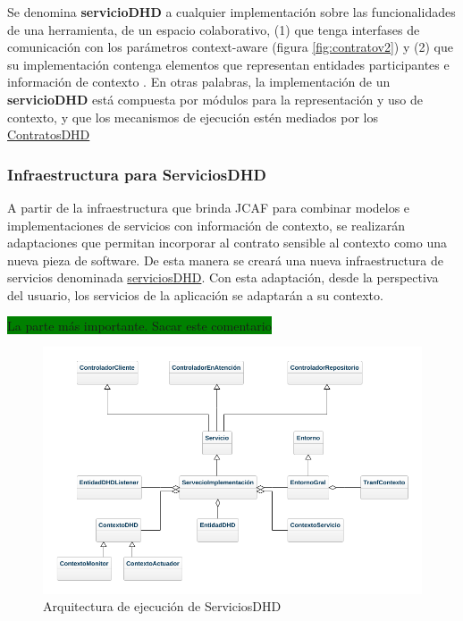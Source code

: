 \begin{itemize}
\begin{defi}[ServiciosDHD:] \label{serviciosDHD}

Se denomina \textbf{servicioDHD} a cualquier implementación sobre las funcionalidades de una herramienta, de un espacio colaborativo, (1) que tenga interfases de comunicación con los parámetros context-aware (figura \ref{fig:contratov2}) y (2) que su implementación contenga elementos que representan entidades participantes e información de contexto \cite{Dey}. En otras palabras, la implementación de un \textbf{servicioDHD} está compuesta por módulos para la representación y uso de contexto, y que los mecanismos de ejecución estén mediados por los \hyperref[contratosdhd]{ContratosDHD} 

\end{defi}

\subsubsection{Infraestructura para ServiciosDHD}

A partir de la infraestructura que brinda JCAF para combinar modelos e implementaciones de servicios con información de contexto, se realizarán adaptaciones que permitan incorporar al contrato sensible al contexto como una nueva pieza de software. De esta manera se creará una nueva infraestructura de servicios denominada \hyperref[serviciosDHD]{serviciosDHD}. Con esta adaptación, desde la perspectiva del usuario, los servicios de la aplicación se adaptarán a su contexto. 

\colorbox{green}{La parte más importante. Sacar este comentario}


\begin{figure}
\begin{center}
\includegraphics[width=5 in,totalheight=3.2 in]{Ch4/serviciosDHD.png}
\caption{Arquitectura de ejecución de ServiciosDHD}
\label{fig:serviciosDHD}
\end{center}
\end{figure}



\end{itemize}
